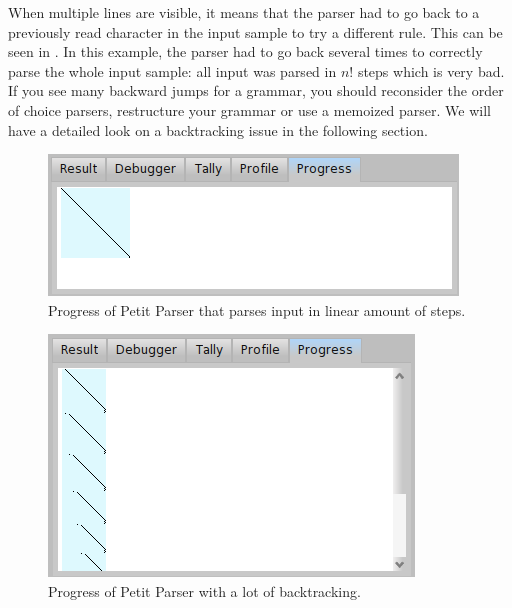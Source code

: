 \documentclass[a4paper,10pt,twoside]{book}
\begin{document}
\begin{description}
  When multiple lines are visible, it means that the parser had
  to go back to a previously read character in the input sample to try
  a different rule. This can be seen in
  . In this example, the parser had to
  go back several times to correctly parse the whole input sample: all
  input was parsed in $n!$ steps which is very bad. %
  If you see many backward jumps for a grammar, you should
  reconsider the order of choice parsers, restructure your grammar
  or use a memoized parser.
  We will have a detailed look on a backtracking issue in the
  following section.

  \begin{figure}[ht]
    \begin{center}
      \includegraphics[scale=0.5]{PPBrowserProgressLinear}
      \caption{Progress of Petit Parser that parses input in linear amount of steps. \label{fig:pp/progressLinear}}
    \end{center}
  \end{figure}

  \begin{figure}[ht]
    \begin{center}
      \includegraphics[scale=0.5]{PPBrowserProgressBacktracking}
      \caption{Progress of Petit Parser with a lot of backtracking. \label{fig:pp/progressBacktracking}}
    \end{center}
  \end{figure}
\end{description}
\end{document}
